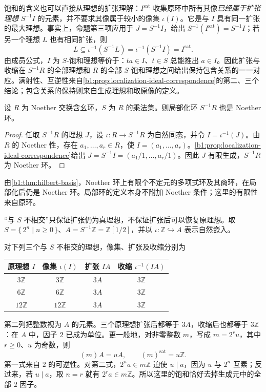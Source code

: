 \ProseParagraphBreak
饱和的含义也可以直接从理想的扩张理解：\(I^{\mathrm{sat}}\) 收集原环中所有其像\emph{已经属于扩张理想} \(S^{-1}I\) 的元素，并不要求其像属于较小的像集 \(\iota(I)\)。它是与 \(I\) 具有同一扩张的最大理想。事实上，命题第三项应用于 \(J=S^{-1}I\)，给出 \(S^{-1}(I^{\mathrm{sat}})=S^{-1}I\)；若另一个理想 \(L\) 也有相同扩张，则
\[
	L\subseteq\iota^{-1}(S^{-1}L)=\iota^{-1}(S^{-1}I)=I^{\mathrm{sat}}.
\]
由成员公式，\(I\) 为 \(S\)-饱和理想等价于：\(ta\in I\)、\(t\in S\) 总能推出 \(a\in I\)。因此扩张与收缩在 \(S^{-1}R\) 的全部理想和 \(R\) 的全部 \(S\)-饱和理想之间给出保持包含关系的一一对应。满射性、互逆性来自\cref{b1:prop:localization-ideal-correspondence}的第二、三个结论；包含关系的保持则来自生成理想和取原像的定义。

\begin{corollary}\label{b1:cor:noetherian-localization}
	设 \(R\) 为 Noether 交换含幺环，\(S\) 为 \(R\) 的乘法集。则局部化环 \(S^{-1}R\) 也是 Noether 环。
\end{corollary}
\begin{proof}
	任取 \(S^{-1}R\) 的理想 \(J\)，设 \(\iota:R\rightarrow S^{-1}R\) 为自然同态，并令 \(I=\iota^{-1}(J)\)。由 \(R\) 的 Noether 性，存在 \(a_1,\ldots,a_r\in R\)，使 \(I=(a_1,\ldots,a_r)\)。\cref{b1:prop:localization-ideal-correspondence}给出 \(J=S^{-1}I=(a_1/1,\ldots,a_r/1)\)。因此 \(J\) 有限生成，\(S^{-1}R\) 为 Noether 环。
\end{proof}

由\cref{b1:thm:hilbert-basis}，Noether 环上有限个不定元的多项式环及其商环，在局部化后仍是 Noether 环。局部环的定义本身不附加 Noether 条件；这里的有限性来自原环。

\ProseParagraphBreak
“与 \(S\) 不相交”只保证扩张仍为真理想，不保证扩张后可以恢复原理想。取 \(S=\{\,2^n\mid n\geq0\,\}\)、\(A=S^{-1}\mathbb Z=\mathbb Z[1/2]\)，并以 \(\iota:\mathbb Z\hookrightarrow A\) 表示自然嵌入。

\begin{samepage}
	对下列三个与 \(S\) 不相交的理想，像集、扩张及收缩分别为
	\begin{center}
		\begin{tabular}{@{}cccc@{}}
			\toprule
			原理想 \(I\) & 像集 \(\iota(I)\) & 扩张 \(IA\) & 收缩 \(\iota^{-1}(IA)\) \\
			\midrule
			\(3\mathbb Z\) & \(3\mathbb Z\) & \(3A\) & \(3\mathbb Z\) \\
			\(6\mathbb Z\) & \(6\mathbb Z\) & \(3A\) & \(3\mathbb Z\) \\
			\(12\mathbb Z\) & \(12\mathbb Z\) & \(3A\) & \(3\mathbb Z\) \\
			\bottomrule
		\end{tabular}
	\end{center}
\end{samepage}
第二列把整数视为 \(A\) 的元素。三个原理想扩张后都等于 \(3A\)，收缩后也都等于 \(3\mathbb Z\)：在 \(A\) 中，因子 \(2\) 已成为单位。更一般地，对非零整数 \(m\)，写成 \(m=2^ru\)，其中 \(r\geq0\)、\(u\) 为奇数，则
\[
	(m)A=uA,\qquad (m)^{\mathrm{sat}}=u\mathbb Z.
\]
第一式来自 \(2\) 的可逆性。对第二式，\(2^na\in m\mathbb Z\) 迫使 \(u\mid a\)，因为 \(u\) 与 \(2^n\) 互素；反过来，若 \(u\mid a\)，取 \(n=r\) 就有 \(2^ra\in m\mathbb Z\)。所以这里的饱和恰好去掉生成元中的全部 \(2\) 因子。

